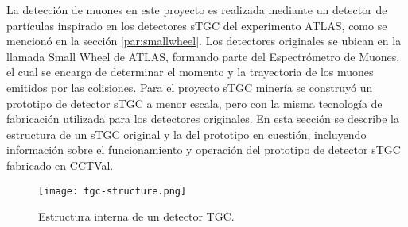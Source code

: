
La detección de muones en este proyecto es realizada mediante un detector de partículas inspirado en los detectores sTGC del experimento ATLAS, como se mencionó en la sección  \ref{par:smallwheel}. Los detectores originales se ubican en la llamada Small Wheel de ATLAS, formando parte del Espectrómetro de Muones, el cual se encarga de determinar el momento y la trayectoria de los muones emitidos por las colisiones. Para el proyecto sTGC minería se construyó  un prototipo de detector sTGC a menor escala, pero con la misma tecnología de fabricación utilizada para los detectores originales. En esta sección se describe la estructura de un sTGC original y la del prototipo en cuestión, incluyendo información sobre el funcionamiento y operación del prototipo de detector sTGC fabricado en CCTVal.


%

\begin{figure}[h]
	\centering
	\texttt{[image: tgc-structure.png]}
	\caption{Estructura interna de un detector TGC\cite{Chapman2014ATLASUpgrade}.}
	\label{img:stgc-structure}
\end{figure}

